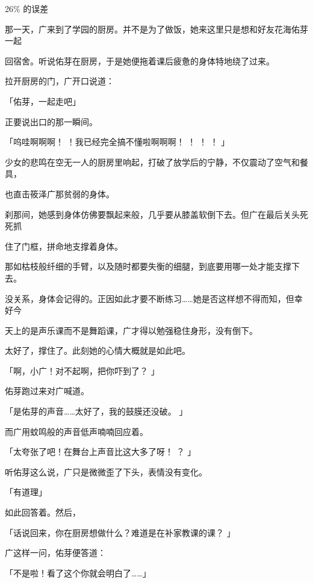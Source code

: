 26\% 的误差\par
那一天，广来到了学园的厨房。并不是为了做饭，她来这里只是想和好友花海佑芽一起\par
回宿舍。听说佑芽在厨房，于是她便拖着课后疲惫的身体特地绕了过来。\par
拉开厨房的门，广开口说道：\par
「佑芽，一起走吧」\par
正要说出口的那一瞬间。\par
「呜哇啊啊啊！ ！我已经完全搞不懂啦啊啊啊！ ！ ！ ！ 」\par
少女的悲鸣在空无一人的厨房里响起，打破了放学后的宁静，不仅震动了空气和餐具，\par
也直击筱泽广那贫弱的身体。\par
刹那间，她感到身体仿佛要飘起来般，几乎要从膝盖软倒下去。但广在最后关头死死抓\par
住了门框，拼命地支撑着身体。\par
那如枯枝般纤细的手臂，以及随时都要失衡的细腿，到底要用哪一处才能支撑下去。\par
没关系，身体会记得的。正因如此才要不断练习……她是否这样想不得而知，但幸好今\par
天上的是声乐课而不是舞蹈课，广才得以勉强稳住身形，没有倒下。\par
太好了，撑住了。此刻她的心情大概就是如此吧。\par
「啊，小广！对不起啊，把你吓到了？ 」\par
佑芽跑过来对广喊道。\par
「是佑芽的声音……太好了，我的鼓膜还没破。 」\par
而广用蚊鸣般的声音低声喃喃回应着。\par
「太夸张了吧！在舞台上声音比这大多了呀！ ？ 」\par
听佑芽这么说，广只是微微歪了下头，表情没有变化。\par
「有道理」\par
如此回答着。然后，\par
「话说回来，你在厨房想做什么？难道是在补家教课的课？ 」\par
广这样一问，佑芽便答道：\par
「不是啦！看了这个你就会明白了……」\par

